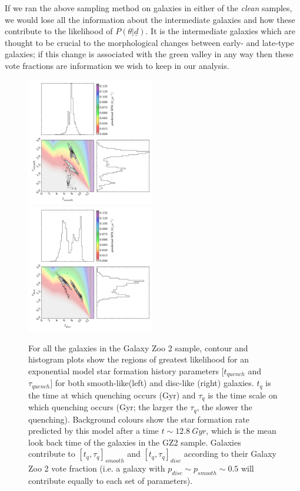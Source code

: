 \documentclass{mn2e}
\begin{document}
If we ran the above sampling method on galaxies in either of the \emph{clean} samples, we would lose all the information about the intermediate galaxies and how these contribute to the likelihood of $P(\theta|\underline{d})$. It is the intermediate galaxies which are thought to be crucial to the morphological changes between early- and late-type galaxies; if this change is associated with the green valley in any way then these vote fractions are information we wish to keep in our analysis. 

\begin{figure}
\includegraphics[width=0.4975\textwidth]{all_smooth.pdf}
\includegraphics[width=0.4975\textwidth]{all_disc.pdf}
\caption[8pt]{For all the galaxies in the Galaxy Zoo 2 sample, contour and histogram plots show the regions of greatest likelihood for an exponential model star formation history parameters $[t_{quench}$ and $\tau_{quench}]$ for both smooth-like(left) and disc-like (right) galaxies. $t_{q}$ is the time at which quenching occurs (Gyr) and $\tau_{q}$ is the time scale on which quenching occurs (Gyr; the larger the $\tau_{q}$, the slower the quenching). Background colours show the star formation rate predicted by this model after a time $t \sim 12.8~Gyr$, which is the mean look back time of the galaxies in the GZ2 sample. Galaxies contribute  to $[t_{q}, \tau_{q}]_{smooth}$ and $[t_{q}, \tau_{q}]_{disc}$ according to their Galaxy Zoo 2 vote fraction (i.e. a galaxy with $p_{disc} \sim p_{smooth} \sim 0.5$ will contribute equally to each set of parameters).}
\label{all}
\end{figure}
\end{document}

